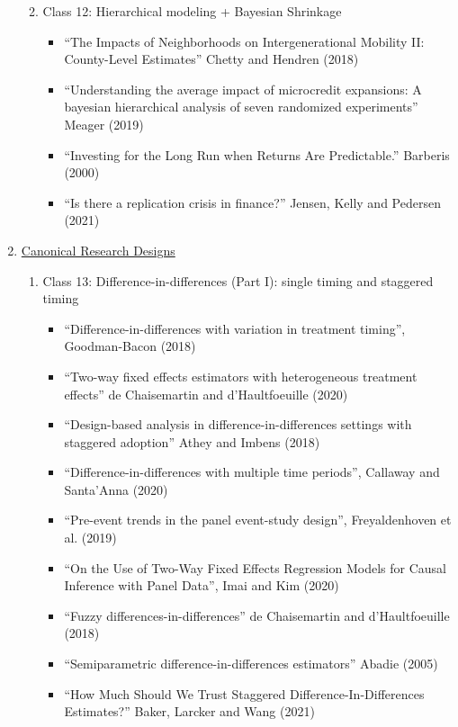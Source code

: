 \documentclass[11pt, a4paper]{article}
\begin{document}
\begin{enumerate}
\begin{enumerate}
\begin{itemize}
    \end{itemize}
  \item Class 12: Hierarchical modeling + Bayesian Shrinkage
    \begin{itemize}
    \item ``The Impacts of Neighborhoods on Intergenerational Mobility II: County-Level Estimates'' Chetty and Hendren (2018)
    \item ``Understanding the average impact of microcredit expansions: A bayesian hierarchical analysis of seven randomized experiments'' Meager (2019)
    \item ``Investing for the Long Run when Returns Are Predictable.'' Barberis (2000)
    \item ``Is there a replication crisis in finance?'' Jensen, Kelly and Pedersen (2021)
    \end{itemize}
  \end{enumerate}
\item  \underline{Canonical Research Designs}
  \begin{enumerate}
  \item Class 13: Difference-in-differences (Part I): single timing and staggered timing
    \begin{itemize}
    \item ``Difference-in-differences with variation in treatment timing'', Goodman-Bacon (2018)
    \item ``Two-way fixed effects estimators with heterogeneous treatment effects'' de Chaisemartin and d'Haultfoeuille (2020)
    \item ``Design-based analysis in difference-in-differences settings with staggered adoption'' Athey and Imbens (2018)
    \item ``Difference-in-differences with multiple time periods'', Callaway and Santa'Anna (2020)
    \item ``Pre-event trends in the panel event-study design'', Freyaldenhoven et al. (2019)
    \item ``On the Use of Two-Way Fixed Effects Regression Models for Causal Inference with Panel Data'', Imai and Kim (2020)
    \item ``Fuzzy differences-in-differences'' de Chaisemartin and d'Haultfoeuille (2018)
    \item ``Semiparametric difference-in-differences estimators'' Abadie (2005)
    \item ``How Much Should We Trust Staggered Difference-In-Differences Estimates?'' Baker, Larcker and Wang (2021)
    \end{itemize}

\end{enumerate}
\end{enumerate}
\end{document}
